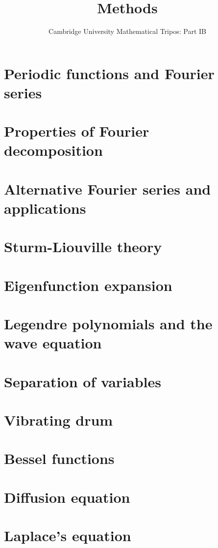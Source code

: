 \documentclass{article}
\title{Methods}
\author{Cambridge University Mathematical Tripos: Part IB}
\begin{document}
\maketitle

\tableofcontentsnewpage{}

\section{Periodic functions and Fourier series}

\section{Properties of Fourier decomposition}

\section{Alternative Fourier series and applications}

\section{Sturm-Liouville theory}

\section{Eigenfunction expansion}

\section{Legendre polynomials and the wave equation}

\section{Separation of variables}

\section{Vibrating drum}

\section{Bessel functions}

\section{Diffusion equation}

\section{Laplace's equation}

\end{document}

